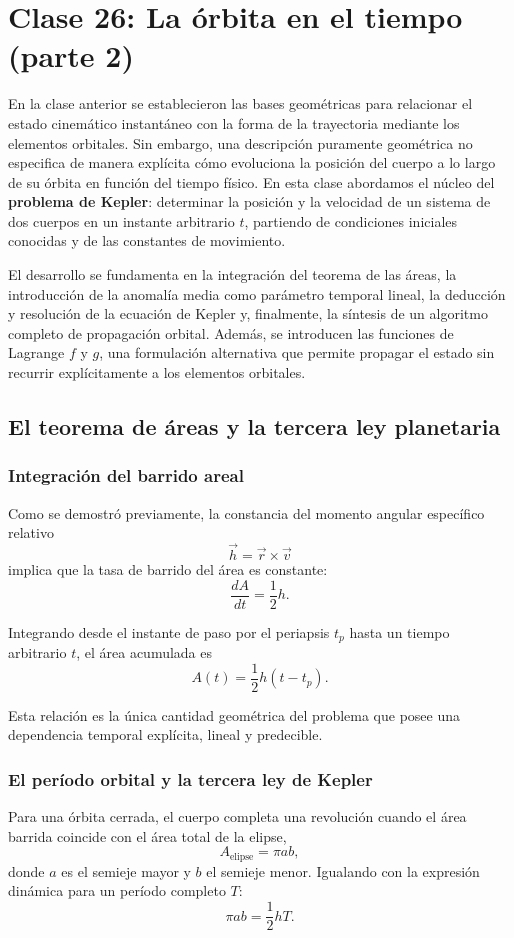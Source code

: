 \chapter{Clase 26: La órbita en el tiempo (parte 2)}

En la clase anterior se establecieron las bases geométricas para relacionar el estado cinemático instantáneo con la forma de la trayectoria mediante los elementos orbitales. Sin embargo, una descripción puramente geométrica no especifica de manera explícita cómo evoluciona la posición del cuerpo a lo largo de su órbita en función del tiempo físico. En esta clase abordamos el núcleo del \textbf{problema de Kepler}: determinar la posición y la velocidad de un sistema de dos cuerpos en un instante arbitrario \(t\), partiendo de condiciones iniciales conocidas y de las constantes de movimiento.

El desarrollo se fundamenta en la integración del teorema de las áreas, la introducción de la anomalía media como parámetro temporal lineal, la deducción y resolución de la ecuación de Kepler y, finalmente, la síntesis de un algoritmo completo de propagación orbital. Además, se introducen las funciones de Lagrange \(f\) y \(g\), una formulación alternativa que permite propagar el estado sin recurrir explícitamente a los elementos orbitales.

\section{El teorema de áreas y la tercera ley planetaria}
\subsection{Integración del barrido areal}
Como se demostró previamente, la constancia del momento angular específico relativo
\[
\vec{h} = \vec{r} \times \vec{v}
\]
implica que la tasa de barrido del área es constante:
\[
\frac{dA}{dt} = \frac{1}{2}h.
\]

Integrando desde el instante de paso por el periapsis \(t_p\) hasta un tiempo arbitrario \(t\), el área acumulada es
\[
A(t) = \frac{1}{2}h(t-t_p).
\]

Esta relación es la única cantidad geométrica del problema que posee una dependencia temporal explícita, lineal y predecible.

\subsection{El período orbital y la tercera ley de Kepler}
Para una órbita cerrada, el cuerpo completa una revolución cuando el área barrida coincide con el área total de la elipse,
\[
A_{\text{elipse}} = \pi ab,
\]
donde \(a\) es el semieje mayor y \(b\) el semieje menor. Igualando con la expresión dinámica para un período completo \(T\):
\[
\pi ab = \frac{1}{2}hT.
\]

